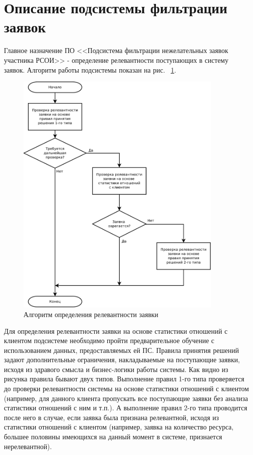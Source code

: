 \documentclass[utf8x, 12pt]{G7-32}
\begin{document}
\section{Описание подсистемы фильтрации заявок}
	Главное назначение ПО <<Подсистема фильтрации нежелательных заявок участника 
РСОИ>> - определение релевантности поступающих в систему заявок. Алгоритм работы 
подсистемы показан на рис. ~\ref{fig:algorithm}.
\begin{figure}[ht!]
        \centering
        \includegraphics[width=0.9\textwidth]{inc/dia/rpz-algorithm}
        \caption{Алгоритм определения релевантности заявки}
        \label{fig:algorithm}
\end{figure}
Для определения релевантности заявки на основе статистики отношений с клиентом
подсистеме необходимо пройти предварительное обучение с использованием данных,
предоставляемых ей ПС. Правила принятия решений задают дополнительные 
ограничения, накладываемые на поступающие заявки, исходя из здравого смысла и 
бизнес-логики работы системы. Как видно из рисунка правила бывают двух типов.
Выполнение правил 1-го типа проверяется до проверки релевантности системы на
основе статистики отношений с клиентом (например, для данного клиента  
пропускать все поступающие заявки без анализа статистики отношений с ним и т.п.). 
А выполнение правил 2-го типа проводится после него в случае, если заявка была
признана релевантной, исходя из статистики отношений с клиентом (например, заявка на 
количество ресурса, большее половины имеющихся на данный момент в системе, 
признается нерелевантной).
\end{document}
